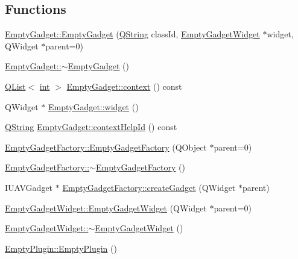 \subsection*{Functions}
\begin{DoxyCompactItemize}
\item 
\hyperlink{group___empty_gadget_plugin_ga8dd994979515e846487d11c9ee923175}{Empty\-Gadget\-::\-Empty\-Gadget} (\hyperlink{group___u_a_v_objects_plugin_gab9d252f49c333c94a72f97ce3105a32d}{Q\-String} class\-Id, \hyperlink{class_empty_gadget_widget}{Empty\-Gadget\-Widget} $\ast$widget, Q\-Widget $\ast$parent=0)
\item 
\hyperlink{group___empty_gadget_plugin_ga4c9294b56cd062b22669146def8c2cde}{Empty\-Gadget\-::$\sim$\-Empty\-Gadget} ()
\item 
\hyperlink{class_q_list}{Q\-List}$<$ \hyperlink{ioapi_8h_a787fa3cf048117ba7123753c1e74fcd6}{int} $>$ \hyperlink{group___empty_gadget_plugin_ga640557d465e9e57a080f459f9ba33c53}{Empty\-Gadget\-::context} () const 
\item 
Q\-Widget $\ast$ \hyperlink{group___empty_gadget_plugin_gaf90ce4fcadfb337055b06effe0fa08cb}{Empty\-Gadget\-::widget} ()
\item 
\hyperlink{group___u_a_v_objects_plugin_gab9d252f49c333c94a72f97ce3105a32d}{Q\-String} \hyperlink{group___empty_gadget_plugin_ga9ce48ac1c22eba730811d0885ecc9606}{Empty\-Gadget\-::context\-Help\-Id} () const 
\item 
\hyperlink{group___empty_gadget_plugin_gaf98a291f00c46f8dfde8d7c9d6f8fb6c}{Empty\-Gadget\-Factory\-::\-Empty\-Gadget\-Factory} (Q\-Object $\ast$parent=0)
\item 
\hyperlink{group___empty_gadget_plugin_gabec68115923f555ddd7cc38ba7a3ee80}{Empty\-Gadget\-Factory\-::$\sim$\-Empty\-Gadget\-Factory} ()
\item 
I\-U\-A\-V\-Gadget $\ast$ \hyperlink{group___empty_gadget_plugin_gaf091c2a41b028c469236b6ad70d4addf}{Empty\-Gadget\-Factory\-::create\-Gadget} (Q\-Widget $\ast$parent)
\item 
\hyperlink{group___empty_gadget_plugin_ga49fd1e7c797821911cc8c1aaf39af255}{Empty\-Gadget\-Widget\-::\-Empty\-Gadget\-Widget} (Q\-Widget $\ast$parent=0)
\item 
\hyperlink{group___empty_gadget_plugin_ga31f0094726f11e434e12aaa0a764d467}{Empty\-Gadget\-Widget\-::$\sim$\-Empty\-Gadget\-Widget} ()
\item 
\hyperlink{group___empty_gadget_plugin_ga18898df1886d72c9e78700927c8f57c6}{Empty\-Plugin\-::\-Empty\-Plugin} ()
\item 

\end{DoxyCompactItemize}
